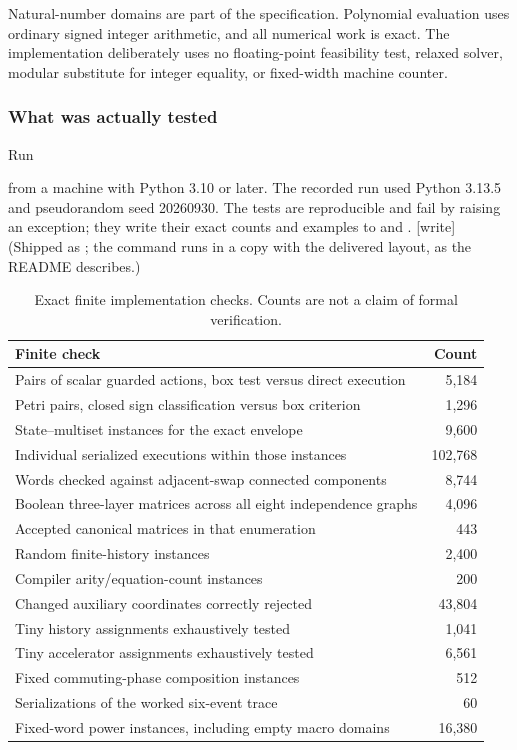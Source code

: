 \documentclass[11pt,a4paper]{article}
\theoremstyle{definition}
\theoremstyle{remark}
\newcommand{\code}[1]{\texttt{\detokenize{#1}}}
\newcommand{\wtag}{\textup{[write]}}%
\begin{document}
Natural-number domains are part of the specification. Polynomial evaluation uses ordinary signed integer arithmetic, and all numerical work is exact. The implementation deliberately uses no floating-point feasibility test, relaxed solver, modular substitute for integer equality, or fixed-width machine counter.

\subsubsection{What was actually tested}
Run
\begin{quote}\code{python code/verify.py}\end{quote}
from a machine with Python 3.10 or later. The recorded run used Python 3.13.5 and pseudorandom seed 20260930. The tests are reproducible and fail by raising an exception; they write their exact counts and examples to \code{data/} and \code{examples/}. \wtag{} (Shipped as ; the command runs  in a copy with the delivered layout, as the README describes.)

\begin{table}[ht]
\centering\small
\begin{tabular}{p{}r}
\toprule
Finite check & Count\\\midrule
Pairs of scalar guarded actions, box test versus direct execution & 5,184\\
Petri pairs, closed sign classification versus box criterion & 1,296\\
State--multiset instances for the exact envelope & 9,600\\
Individual serialized executions within those instances & 102,768\\
Words checked against adjacent-swap connected components & 8,744\\
Boolean three-layer matrices across all eight independence graphs & 4,096\\
Accepted canonical matrices in that enumeration & 443\\
Random finite-history instances & 2,400\\
Compiler arity/equation-count instances & 200\\
Changed auxiliary coordinates correctly rejected & 43,804\\
Tiny history assignments exhaustively tested & 1,041\\
Tiny accelerator assignments exhaustively tested & 6,561\\
Fixed commuting-phase composition instances & 512\\
Serializations of the worked six-event trace & 60\\
Fixed-word power instances, including empty macro domains & 16,380\\
\bottomrule
\end{tabular}
\caption{Exact finite implementation checks. Counts are not a claim of formal verification.}\label{cdc:ct:tab:tests}
\end{table}
\end{document}
